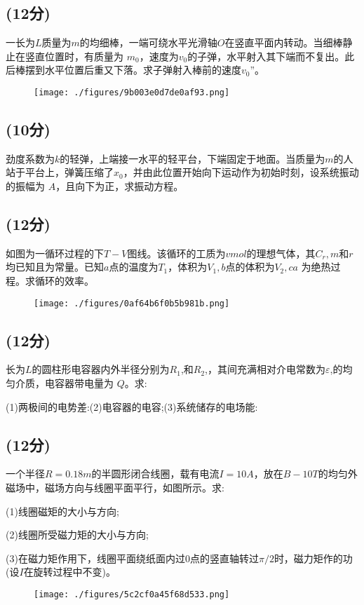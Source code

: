 \subsection{(12分)}
一长为$L$质量为$m$的均细棒，一端可绕水平光滑轴$O$在竖直平面内转动。当细棒静止在竖直位置时，有质量为 $m_0$，速度为$v_0$的子弹，水平射入其下端而不复出。此后棒摆到水平位置后重又下落。求子弹射入棒前的速度$v_0$”。
\begin{figure}[ht]
\centering
\texttt{[image: ./figures/9b003e0d7de0af93.png]}
\caption{} \label{fig_NIU06_4}
\end{figure}
\subsection{(10分)}
劲度系数为$k$的轻弹，上端接一水平的轻平台，下端固定于地面。当质量为$m$的人站于平台上，弹簧压缩了$x_0$，并由此位置开始向下运动作为初始时刻，设系统振动的振幅为 $A$，且向下为正，求振动方程。
\subsection{(12分)}
如图为一循环过程的下$T-V$图线。该循环的工质为$v mol$的理想气体，其$C_r,m$和$r$均已知且为常量。已知$a$点的温度为$T_1$，体积为$V_1,b$点的体积为$V_2,ca$ 为绝热过程。求循环的效率。
\begin{figure}[ht]
\centering
\texttt{[image: ./figures/0af64b6f0b5b981b.png]}
\caption{} \label{fig_NIU06_5}
\end{figure}
\subsection{(12分)}
长为$L$的圆柱形电容器内外半径分别为$R_1$,和$R_2$,，其间充满相对介电常数为$\varepsilon$,的均匀介质，电容器带电量为 $Q$。求:

(1)两极间的电势差:(2)电容器的电容;(3)系统储存的电场能:

\subsection{(12分)}
一个半径$R=0.18m$的半圆形闭合线圈，载有电流$I=10A$，放在$B-10T$的均匀外磁场中，磁场方向与线圈平面平行，如图所示。求:

(1)线圈磁矩的大小与方向;

(2)线圈所受磁力矩的大小与方向;

(3)在磁力矩作用下，线圈平面绕纸面内过0点的竖直轴转过$\pi/2$时，磁力矩作的功(设$I$在旋转过程中不变)。
\begin{figure}[ht]
\centering
\texttt{[image: ./figures/5c2cf0a45f68d533.png]}
\caption{} \label{fig_NIU06_6}
\end{figure}
